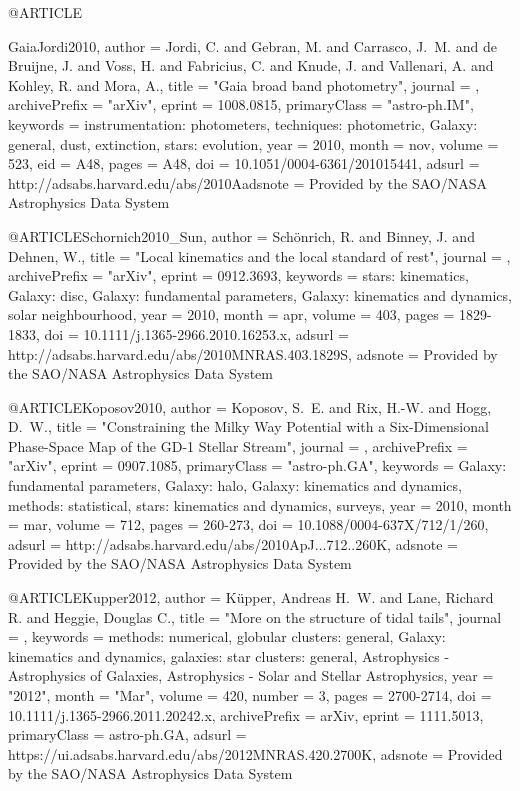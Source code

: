 \documentclass[apj]{emulateapj}
\begin{document}
{{{{{{{{{{{{{@ARTICLE{GaiaJordi2010,
   author = {{Jordi}, C. and {Gebran}, M. and {Carrasco}, J.~M. and {de Bruijne}, J. and 
	{Voss}, H. and {Fabricius}, C. and {Knude}, J. and {Vallenari}, A. and 
	{Kohley}, R. and {Mora}, A.},
    title = "{Gaia broad band photometry}",
  journal = {\aap},
archivePrefix = "arXiv",
   eprint = {1008.0815},
 primaryClass = "astro-ph.IM",
 keywords = {instrumentation: photometers, techniques: photometric, Galaxy: general, dust, extinction, stars: evolution},
     year = 2010,
    month = nov,
   volume = 523,
      eid = {A48},
    pages = {A48},
      doi = {10.1051/0004-6361/201015441},
   adsurl = {http://adsabs.harvard.edu/abs/2010Aadsnote = {Provided by the SAO/NASA Astrophysics Data System}
}




@ARTICLE{Schornich2010_Sun,
   author = {{Sch{\"o}nrich}, R. and {Binney}, J. and {Dehnen}, W.},
    title = "{Local kinematics and the local standard of rest}",
  journal = {\mnras},
archivePrefix = "arXiv",
   eprint = {0912.3693},
 keywords = {stars: kinematics, Galaxy: disc, Galaxy: fundamental parameters, Galaxy: kinematics and dynamics, solar neighbourhood},
     year = 2010,
    month = apr,
   volume = 403,
    pages = {1829-1833},
      doi = {10.1111/j.1365-2966.2010.16253.x},
   adsurl = {http://adsabs.harvard.edu/abs/2010MNRAS.403.1829S},
  adsnote = {Provided by the SAO/NASA Astrophysics Data System}
}


@ARTICLE{Koposov2010,
   author = {{Koposov}, S.~E. and {Rix}, H.-W. and {Hogg}, D.~W.},
    title = "{Constraining the Milky Way Potential with a Six-Dimensional Phase-Space Map of the GD-1 Stellar Stream}",
  journal = {\apj},
archivePrefix = "arXiv",
   eprint = {0907.1085},
 primaryClass = "astro-ph.GA",
 keywords = {Galaxy: fundamental parameters, Galaxy: halo, Galaxy: kinematics and dynamics, methods: statistical, stars: kinematics and dynamics, surveys},
     year = 2010,
    month = mar,
   volume = 712,
    pages = {260-273},
      doi = {10.1088/0004-637X/712/1/260},
   adsurl = {http://adsabs.harvard.edu/abs/2010ApJ...712..260K},
  adsnote = {Provided by the SAO/NASA Astrophysics Data System}
}


@ARTICLE{Kupper2012,
       author = {{K{\"u}pper}, Andreas H.~W. and {Lane}, Richard R. and
         {Heggie}, Douglas C.},
        title = "{More on the structure of tidal tails}",
      journal = {\mnras},
     keywords = {methods: numerical, globular clusters: general, Galaxy: kinematics and dynamics, galaxies: star clusters: general, Astrophysics - Astrophysics of Galaxies, Astrophysics - Solar and Stellar Astrophysics},
         year = "2012",
        month = "Mar",
       volume = {420},
       number = {3},
        pages = {2700-2714},
          doi = {10.1111/j.1365-2966.2011.20242.x},
archivePrefix = {arXiv},
       eprint = {1111.5013},
 primaryClass = {astro-ph.GA},
       adsurl = {https://ui.adsabs.harvard.edu/abs/2012MNRAS.420.2700K},
      adsnote = {Provided by the SAO/NASA Astrophysics Data System}
}


}}}}}}}}}}}}}}
\end{document}
